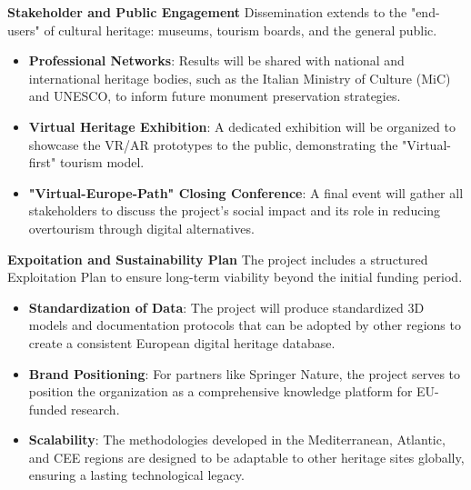 \textbf{Stakeholder and Public Engagement}
Dissemination extends to the "end-users" of cultural heritage: museums, tourism boards, and the general public.
\begin{itemize}
    \item \textbf{Professional Networks}: Results will be shared with national and international heritage bodies, such as the Italian Ministry of Culture (MiC) and UNESCO, to inform future monument preservation strategies.
    \item \textbf{Virtual Heritage Exhibition}: A dedicated exhibition will be organized to showcase the VR/AR prototypes to the public, demonstrating the "Virtual-first" tourism model.
    \item \textbf{"Virtual-Europe-Path" Closing Conference}: A final event will gather all stakeholders to discuss the project's social impact and its role in reducing overtourism through digital alternatives.
\end{itemize}

\textbf{Expoitation and Sustainability Plan}
The project includes a structured Exploitation Plan to ensure long-term viability beyond the initial funding period.
\begin{itemize}
    \item \textbf{Standardization of Data}: The project will produce standardized 3D models and documentation protocols that can be adopted by other regions to create a consistent European digital heritage database.
    \item \textbf{Brand Positioning}: For partners like Springer Nature, the project serves to position the organization as a comprehensive knowledge platform for EU-funded research.
    \item \textbf{Scalability}: The methodologies developed in the Mediterranean, Atlantic, and CEE regions are designed to be adaptable to other heritage sites globally, ensuring a lasting technological legacy.
\end{itemize}